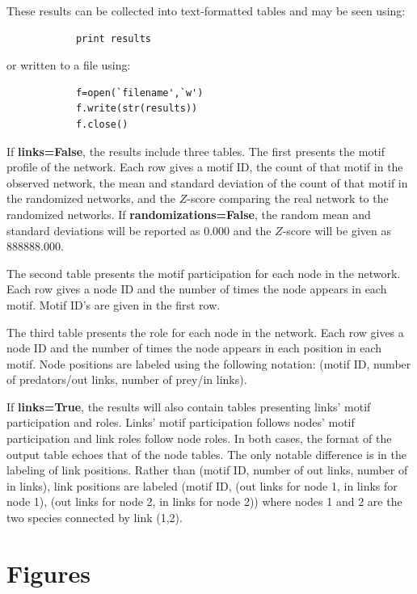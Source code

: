\documentclass[12pt]{article}
\begin{document}
			These results can be collected into text-formatted tables and may be seen using:
			\begin{lstlisting}
			print results
			\end{lstlisting}
			
			or written to a file using:
			\begin{lstlisting}
			f=open(`filename',`w')
			f.write(str(results))
			f.close()
			\end{lstlisting}

			If \textbf{links=False}, the results include three tables. The first presents the motif profile of the network. Each row gives a motif ID, the count of that motif in the observed network, the mean and standard deviation of the count of that motif in the randomized networks, and the $Z$-score comparing the real network to the randomized networks. If \textbf{randomizations=False}, the random mean and standard deviations will be reported as 0.000 and the $Z$-score will be given as 888888.000.
			
			The second table presents the motif participation for each node in the network. Each row gives a node ID and the number of times the node appears in each motif. Motif ID's are given in the first row.
			
			The third table presents the role for each node in the network. Each row gives a node ID and the number of times the node appears in each position in each motif. Node positions are labeled using the following notation: (motif ID, number of predators/out links, number of prey/in links).

			If \textbf{links=True}, the results will also contain tables presenting links' motif participation and roles. Links' motif participation follows nodes' motif participation and link roles follow node roles. In both cases, the format of the output table echoes that of the node tables. The only notable difference is in the labeling of link positions. Rather than (motif ID, number of out links, number of in links), link positions are labeled (motif ID, (out links for node 1, in links for node 1), (out links for node 2, in links for node 2)) where nodes 1 and 2 are the two species connected by link (1,2).

\clearpage

\section{Figures}
\end{document}
